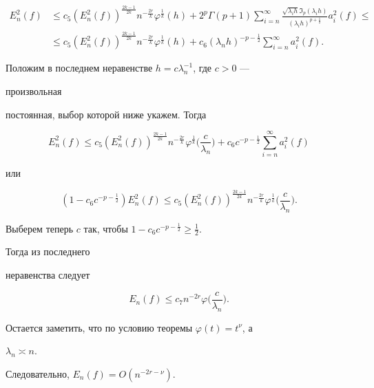 \begin{pf}
\begin{align*}
E^2_n(f)&\le c_5(E^2_n(f))^{\frac{2k-1}{2k}}n^{-\frac{2r}{k}} 


\varphi^{\frac{1}{k}}(h)+2^p\Gamma(p+1)\sum^\infty_{i=n} 


\frac{\sqrt{\lambda_i h}\Im_p(\lambda_i h)} 


{(\lambda_i h)^{p+\frac{1}{2}}}a^2_i(f) \le \\ 


&\le c_5(E^2_n(f))^{\frac{2k-1}{2k}}n^{-\frac{2r}{k}} 


\varphi^{\frac{1}{k}}(h)+c_6(\lambda_n h)^{-p-\frac{1}{2}} 


\sum^\infty_{i=n}a^2_i(f). 


\end{align*} 


Положим в последнем неравенстве $h=c\lambda^{-1}_n$, где $c>0$ --- 


произвольная 


постоянная, выбор которой ниже укажем. Тогда 


$$ 


E^2_n(f)\le c_5(E^2_n(f))^{\frac{2k-1}{2k}}n^{-\frac{2r}{k}} 


\varphi^{\frac{1}{k}}\bigg(\frac{c}{\lambda_n}\bigg)+ 


c_6c^{-p-\frac{1}{2}}\sum^\infty_{i=n}a^2_i(f) 


$$ 


или 


$$ 


(1-c_6c^{-p-\frac{1}{2}})E^2_n(f)\le 


c_5(E^2_n(f))^{\frac{2k-1}{2k}}n^{-\frac{2r}{k}}\varphi^{\frac{1}{k}} 


\bigg(\frac{c}{\lambda_n}\bigg). 


$$ 


Выберем теперь $c$ так, чтобы $1-c_6c^{-p-\frac{1}{2}}\ge\frac{1}{2}$. 


Тогда из последнего 


неравенства следует 


\begin{equation} 


E_n(f)\le c_7n^{-2r}\varphi\bigg(\frac{c}{\lambda_n}\bigg). 


\end{equation} 


Остается заметить, что по условию теоремы $\varphi(t)=t^\nu$, а 


$\lambda_n\asymp n$. 


Следовательно, $E_n(f)=O(n^{-2r-\nu})$. 



\end{pf}
